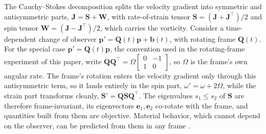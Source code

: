 \documentclass[lettersize,journal]{IEEEtran}
\begin{document}
The Cauchy--Stokes decomposition splits the velocity gradient into
symmetric and antisymmetric
parts, $\mathbf{J} = \mathbf{S} + \mathbf{W}$, with rate-of-strain
tensor $\mathbf{S} = (\mathbf{J} + \mathbf{J}^\top)/2$ and spin tensor
$\mathbf{W} = (\mathbf{J} - \mathbf{J}^\top)/2$, which carries the
vorticity. Consider a time-dependent change of observer
$\mathbf{p}' = \mathbf{Q}(t)\mathbf{p} + \mathbf{b}(t)$, with rotating
frame $\mathbf{Q}(t)$. For the special case
$\mathbf{p}' = \mathbf{Q}(t)\mathbf{p}$, the convention used in the
rotating-frame experiment of this paper, write
$\dot{\mathbf{Q}}\mathbf{Q}^\top = \Omega\left[\begin{smallmatrix} 0 &
-1 \\ 1 & 0 \end{smallmatrix}\right]$, so $\Omega$ is the frame's own
angular rate. The frame's rotation enters the velocity gradient only
through this antisymmetric term, so it lands entirely in the spin
part, $\omega' = \omega + 2\Omega$, while the strain part transforms
cleanly, $\mathbf{S}' = \mathbf{Q}\mathbf{S}\mathbf{Q}^\top$. The
eigenvalues $s_1 \leq s_2$ of $\mathbf{S}$ are therefore
frame-invariant, its eigenvectors $\mathbf{e}_1, \mathbf{e}_2$
co-rotate with the frame, and quantities built from them are
objective. Material behavior, which cannot depend on the observer, can
be predicted from them in any frame \cite{23,24}.
\end{document}
